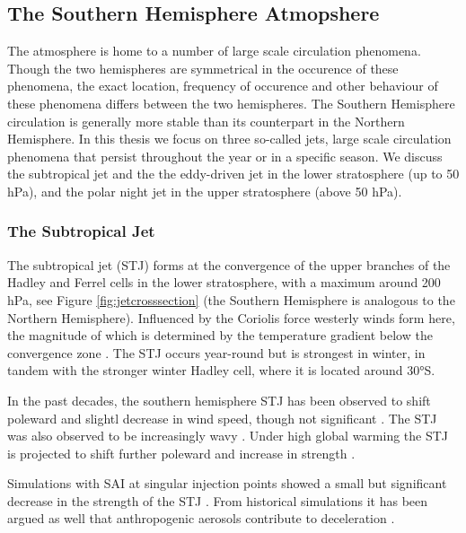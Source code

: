 \subsection{The Southern Hemisphere Atmopshere}
The atmosphere is home to a number of large scale circulation phenomena. Though the two hemispheres are symmetrical in the occurence of these phenomena, the exact location, frequency of occurence and other behaviour of these phenomena differs between the two hemispheres. The Southern Hemisphere circulation is generally more stable than its counterpart in the Northern Hemisphere. In this thesis we focus on three so-called jets, large scale circulation phenomena that persist throughout the year or in a specific season.
We discuss the subtropical jet and the the eddy-driven jet in the lower stratosphere (up to 50 hPa), and the polar night jet in the upper stratosphere (above 50 hPa).


\subsubsection{The Subtropical Jet}
The subtropical jet (STJ) forms at the convergence of the upper branches of the Hadley and Ferrel cells in the lower stratosphere, with a maximum around 200 hPa, see Figure \ref{fig:jetcrosssection} (the Southern Hemisphere is analogous to the Northern Hemisphere). Influenced by the Coriolis force westerly winds form here, the magnitude of which is determined by the temperature gradient below the convergence zone \parencite{zolotov2018variability}. The STJ occurs year-round but is strongest in winter, in tandem with the stronger winter Hadley cell, where it is located around 30°S.

In the past decades, the southern hemisphere STJ has been observed to shift poleward and slightl decrease in wind speed, though not significant \parencite{zolotov2018variability}. The STJ was also observed to be increasingly wavy \parencite{martin2023}. Under high global warming the STJ is projected to shift further poleward and increase in strength \parencite{chenoli2017historical}. 

Simulations with SAI at singular injection points showed a small but significant decrease in the strength of the STJ \parencite{richter2017}. From historical simulations it has been argued as well that anthropogenic aerosols contribute to deceleration \parencite{wang2020}.

